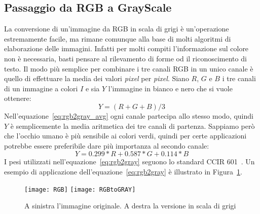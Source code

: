 
\subsection {Passaggio da RGB a GrayScale}
La conversione di un'immagine da RGB in scala di grigi è un'operazione estremamente facile, ma rimane comunque alla base di molti algoritmi di elaborazione delle immagini.
Infatti per molti compiti l'informazione sul colore non è necessaria, basti pensare al rilevamento di forme od il riconoscimento di testo.
Il modo più semplice per combinare i tre canali RGB in un unico canale è quello di effettuare la media dei valori \textit{pixel} per \textit{pixel}.
Siano $R$, $G$ e $B$ i tre canali di un immagine a colori $I$ e sia $Y$ l'immagine in bianco e nero che si vuole ottenere:
\begin{equation}
  Y = (R + G + B)/3
\end{equation}
\label{eq:rgb2gray_avg}
Nell'equazione~\ref{eq:rgb2gray_avg} ogni canale partecipa allo stesso modo, quindi $Y$ è semplicemente la media aritmetica dei tre canali di partenza.
Sappiamo però che l'occhio umano è più sensibile ai colori verdi, quindi per certe applicazioni potrebbe essere preferibile dare più importanza al secondo canale:
\begin{equation}
  Y = 0.299*R + 0.587*G + 0.114*B
\end{equation}
\label{eq:rgb2gray}
I pesi utilizzati nell'equazione~\ref{eq:rgb2gray} seguono lo standard CCIR 601~\cite{ccir601}.
Un esempio di applicazione dell'equazione~\ref{eq:rgb2gray} è illustrato in Figura~\ref{fig:rgb2gray_example}.
\begin{figure}[ht]
  \begin{center}
    \texttt{[image: RGB]}
    \texttt{[image: RGBtoGRAY]}
    \caption{A sinistra l'immagine originale. A destra la versione in scala di grigi}
    \label{fig:rgb2gray_example}
  \end{center}
\end{figure}

